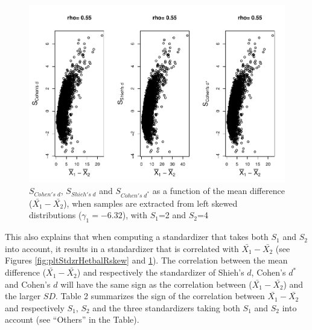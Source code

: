 \documentclass[
  english,
  man,mask]{apa6}
\begin{document}
\begin{figure}
\centering
\includegraphics{Correlation_files/figure-latex/pltStdzrHetbalLskew-1.pdf}
\caption{\label{fig:pltStdzrHetbalLskew}\(S_{Cohen's \; d}\), \(S_{Shieh's \; d}\) and \(S_{Cohen's \; d^*}\) as a function of the mean difference (\(\bar{X_1}-\bar{X_2}\)), when samples are extracted from left skewed distributions (\(\gamma_1 = -6.32\)), with \(S_1\)=2 and \(S_2\)=4}
\end{figure}

This also explains that when computing a standardizer that takes both \(S_1\) and \(S_2\) into account, it results in a standardizer that is correlated with \(\bar{X_1}-\bar{X_2}\) (see Figures \ref{fig:pltStdzrHetbalRskew} and \ref{fig:pltStdzrHetbalLskew}). The correlation between the mean difference (\(\bar{X_1}-\bar{X_2}\)) and respectively the standardizer of Shieh's \(d\), Cohen's \(d^*\) and Cohen's \(d\) will have the same sign as the correlation between (\(\bar{X_1}-\bar{X_2}\)) and the larger \(SD\). Table 2 summarizes the sign of the correlation between \(\bar{X_1}-\bar{X_2}\) and respectively \(S_1\), \(S_2\) and the three standardizers taking both \(S_1\) and \(S_2\) into account (see ``Others'' in the Table).
\end{document}
